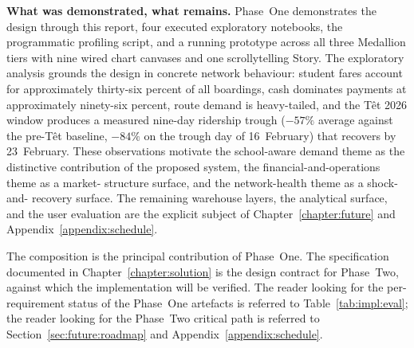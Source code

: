 \medskip
\noindent\textbf{What was demonstrated, what remains.}
Phase~One demonstrates the design through this report, four executed
exploratory notebooks, the programmatic profiling script, and
a running prototype across
all three Medallion tiers with nine wired chart canvases and one
scrollytelling Story. The exploratory analysis grounds the design in
concrete network behaviour: student fares account for approximately
thirty-six percent of all boardings, cash dominates payments at
approximately ninety-six percent, route demand is heavy-tailed, and
the T\^et 2026 window produces a measured nine-day ridership trough
(\(-57\%\) average against the pre-T\^et baseline, \(-84\%\) on the
trough day of 16~February) that recovers by 23~February. These observations motivate the
school-aware demand theme as the distinctive contribution of the
proposed system, the financial-and-operations theme as a market-
structure surface, and the network-health theme as a shock-and-
recovery surface. The remaining warehouse layers, the analytical
surface, and the user evaluation are the explicit subject of
Chapter~\ref{chapter:future} and Appendix~\ref{appendix:schedule}.

The composition is the principal contribution of Phase~One. The
specification documented in Chapter~\ref{chapter:solution} is the
design contract for Phase~Two, against which the implementation will
be verified. The reader looking for the per-requirement status of
the Phase~One artefacts is referred to
Table~\ref{tab:impl:eval}; the reader looking for the Phase~Two
critical path is referred to Section~\ref{sec:future:roadmap} and
Appendix~\ref{appendix:schedule}.
